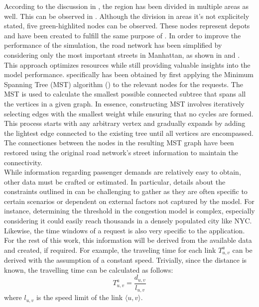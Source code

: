 According to the discussion in , the region has been divided in multiple areas as well. This can be observed in . Although the division in areas it's not explicitely stated, five green-highlited nodes can be observed. These nodes represent depots and have been created to fulfill the same purpose of .  In order to improve the performance of the simulation, the road network has been simplified by considering only the most important streets in Manhattan, as shown in  and . This approach optimizes resources while still providing valuable insights into the model performance.  specifically has been obtained by first applying the Minimum Spanning Tree (MST) algorithm (\cite{networkx2021}) to the relevant nodes for the requests. The MST is used to calculate the smallest possible connected subtree that spans all the vertices in a given graph. In essence, constructing MST involves iteratively selecting edges with the smallest weight while ensuring that no cycles are formed. This process starts with any arbitrary vertex and gradually expands by adding the lightest edge connected to the existing tree until all vertices are encompassed. The connectiones between the nodes in the resulting MST graph have been restored using the original road network's street information to maintain the connectivity.\\
While information regarding passenger demands are relatively easy to obtain, other data must be crafted or estimated. In particular, details about the constraints outlined in  can be challenging to gather as they are often specific to certain scenarios or dependent on external factors not captured by the model. For instance, determining the threshold in the congestion model is complex, especially considering it could easily reach thousands in a densely populated city like NYC. Likewise, the time windows of a request is also very specific to the application. For the rest of this work, this information will be derived from the available data and created, if required. For example, the traveling time for each link $T^a_{u,v}$ can be derived with the assumption of a constant speed. Trivially, since the distance is known, the travelling time can be calculated as follows: \\
\begin{equation}
	T^a_{u,v} = \dfrac{d_{u,v} }{l_{u,v}}
\end{equation}
where $l_{u,v}$ is the speed limit of the link $\langle u,v\rangle$. \\

